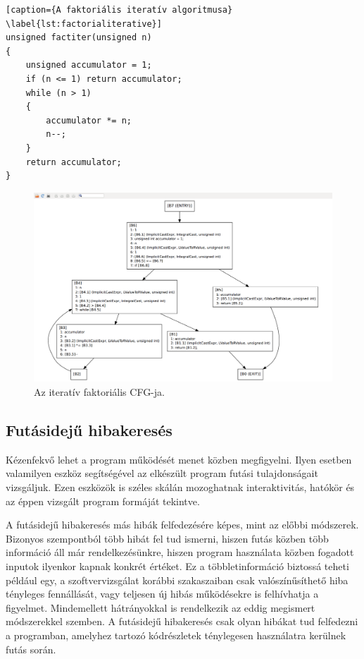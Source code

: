 \documentclass[a4paper,12pt]{report}
\begin{document}
\begin{minipage}{\linewidth}
\begin{lstlisting}[caption={A faktoriális iteratív algoritmusa}
\label{lst:factorialiterative}]
unsigned factiter(unsigned n)
{
    unsigned accumulator = 1;
    if (n <= 1) return accumulator;
    while (n > 1)
    {
        accumulator *= n;
        n--;
    }
    return accumulator;
}
\end{lstlisting}
\end{minipage}

\begin{figure}[h]
\caption{Az iteratív faktoriális CFG-ja.}
\centering
\includegraphics[scale=0.2]{factiter_cfg.png}
\end{figure}

\subsection{Futásidejű hibakeresés}
Kézenfekvő lehet a program működését menet közben megfigyelni. Ilyen esetben valamilyen eszköz segítségével az elkészült program futási tulajdonságait vizsgáljuk. Ezen eszközök is széles skálán mozoghatnak interaktivitás, hatókör és az éppen vizsgált program formáját tekintve.

A futásidejű hibakeresés más hibák felfedezésére képes, mint az előbbi módszerek. Bizonyos szempontból több hibát fel tud ismerni, hiszen futás közben több információ áll már rendelkezésünkre, hiszen program használata közben fogadott inputok ilyenkor kapnak konkrét értéket. Ez a többletinformáció biztossá teheti például egy, a szoftvervizsgálat korábbi szakaszaiban csak valószínűsíthető hiba tényleges fennállását, vagy teljesen új hibás működésekre is felhívhatja a figyelmet. Mindemellett hátrányokkal is rendelkezik az eddig megismert módszerekkel szemben. A futásidejű hibakeresés csak olyan hibákat tud felfedezni a programban, amelyhez tartozó kódrészletek ténylegesen használatra kerülnek futás során.
\end{document}
